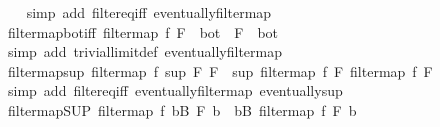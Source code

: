 \begin{isabellebody}
%
\isadelimproof
\ \ %
\endisadelimproof
%
\isatagproof
{}\isamarkupfalse%
\ {\isacharparenleft}{\kern0pt}simp\ add{\isacharcolon}{\kern0pt}\ filter{\isacharunderscore}{\kern0pt}eq{\isacharunderscore}{\kern0pt}iff\ eventually{\isacharunderscore}{\kern0pt}filtermap{\isacharparenright}{\kern0pt}%
\endisatagproof
{\isafoldproof}%
%
\isadelimproof
\isanewline
%
\endisadelimproof
\isanewline
{}\isamarkupfalse%
\ filtermap{\isacharunderscore}{\kern0pt}bot{\isacharunderscore}{\kern0pt}iff{\isacharcolon}{\kern0pt}\ {\isachardoublequoteopen}filtermap\ f\ F\ {\isacharequal}{\kern0pt}\ bot\ {\isasymlongleftrightarrow}\ F\ {\isacharequal}{\kern0pt}\ bot{\isachardoublequoteclose}\isanewline
%
\isadelimproof
\ \ %
\endisadelimproof
%
\isatagproof
{}\isamarkupfalse%
\ {\isacharparenleft}{\kern0pt}simp\ add{\isacharcolon}{\kern0pt}\ trivial{\isacharunderscore}{\kern0pt}limit{\isacharunderscore}{\kern0pt}def\ eventually{\isacharunderscore}{\kern0pt}filtermap{\isacharparenright}{\kern0pt}%
\endisatagproof
{\isafoldproof}%
%
\isadelimproof
\isanewline
%
\endisadelimproof
\isanewline
{}\isamarkupfalse%
\ filtermap{\isacharunderscore}{\kern0pt}sup{\isacharcolon}{\kern0pt}\ {\isachardoublequoteopen}filtermap\ f\ {\isacharparenleft}{\kern0pt}sup\ F{}\ F{}{\isacharparenright}{\kern0pt}\ {\isacharequal}{\kern0pt}\ sup\ {\isacharparenleft}{\kern0pt}filtermap\ f\ F{}{\isacharparenright}{\kern0pt}\ {\isacharparenleft}{\kern0pt}filtermap\ f\ F{}{\isacharparenright}{\kern0pt}{\isachardoublequoteclose}\isanewline
%
\isadelimproof
\ \ %
\endisadelimproof
%
\isatagproof
{}\isamarkupfalse%
\ {\isacharparenleft}{\kern0pt}simp\ add{\isacharcolon}{\kern0pt}\ filter{\isacharunderscore}{\kern0pt}eq{\isacharunderscore}{\kern0pt}iff\ eventually{\isacharunderscore}{\kern0pt}filtermap\ eventually{\isacharunderscore}{\kern0pt}sup{\isacharparenright}{\kern0pt}%
\endisatagproof
{\isafoldproof}%
%
\isadelimproof
\isanewline
%
\endisadelimproof
\isanewline
{}\isamarkupfalse%
\ filtermap{\isacharunderscore}{\kern0pt}SUP{\isacharcolon}{\kern0pt}\ {\isachardoublequoteopen}filtermap\ f\ {\isacharparenleft}{\kern0pt}{\isasymSqunion}b{\isasymin}B{\isachardot}{\kern0pt}\ F\ b{\isacharparenright}{\kern0pt}\ {\isacharequal}{\kern0pt}\ {\isacharparenleft}{\kern0pt}{\isasymSqunion}b{\isasymin}B{\isachardot}{\kern0pt}\ filtermap\ f\ {\isacharparenleft}{\kern0pt}F\ b{\isacharparenright}{\kern0pt}{\isacharparenright}{\kern0pt}{\isachardoublequoteclose}\isanewline
%
\isadelimproof
\ \ %

\end{isabellebody}
